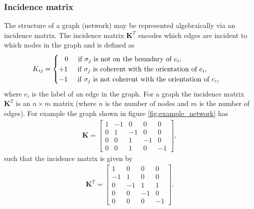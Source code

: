 \subsubsection{Incidence matrix}

The structure of a graph (network) may be represented algebraically via an incidence matrix. The incidence matrix $\mathbf{K}^T$ encodes which edges are incident to which nodes in the graph and is defined as 
\begin{align}
K_{ij}=
\begin{cases}
\hspace{0.3cm} 0 \hspace{0.5cm} \text{if } \sigma_j \text{ is not on the boundary of } e_i, \\
+1 \hspace{0.5cm} \text{if } \sigma_j \text{ is coherent with the orientation of } e_i,\\
-1 \hspace{0.5cm} \text{if } \sigma_j \text{ is not coherent with the orientation of } e_i,
\end{cases}
\end{align}
where $e_i$ is the label of an edge in the graph. For a graph the incidence matrix $\mathbf{K}^T$ is an $n \times m$ matrix (where $n$ is the number of nodes and $m$ is the number of edges). For example the graph shown in figure \ref{fig:example_network} has 
\begin{align*}
\mathbf{K} = \begin{bmatrix}
1 & -1 & 0 & 0 & 0 \\
0 & 1 & -1 & 0 & 0 \\
0 & 0 & 1 & -1 & 0 \\
0 & 0 & 1 & 0 & -1 
\end{bmatrix},
\end{align*}
such that the incidence matrix is given by 
\begin{align*}
\mathbf{K}^T = \begin{bmatrix}
1 & 0 & 0 & 0 \\ 
-1 & 1 & 0 & 0 \\
0 & -1 & 1 & 1 \\
0 & 0 & -1 & 0 \\
0 & 0 & 0 & -1
\end{bmatrix}.
\end{align*}

